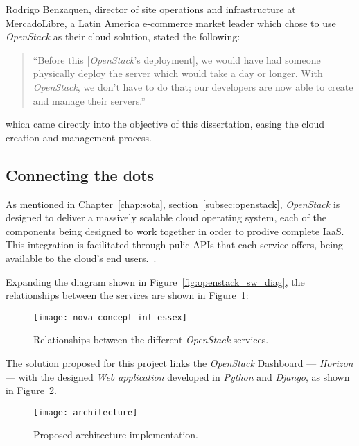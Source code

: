 Rodrigo Benzaquen, director of site operations and infrastructure at MercadoLibre, a Latin America e-commerce market leader which chose to use \textit{OpenStack} as their cloud solution, stated the following:

\begin{quote}
 ``Before this [\textit{OpenStack}'s deployment], we would have had someone physically deploy the server which would take a day or longer. With \textit{OpenStack}, we don't have to do that; our developers are now able to create and manage their servers.''\cite{openstack-userstories}
\end{quote}

which came directly into the objective of this dissertation, easing the cloud creation and management process.

\clearpage
\subsection{Connecting the dots}\label{subsec:architecture}

As mentioned in Chapter~\ref{chap:sota}, section~\ref{subsec:openstack}, \textit{OpenStack} is designed to deliver a massively scalable cloud operating system, each of the components being designed to work together in order to prodive complete IaaS. This integration is facilitated through pulic APIs that each service offers, being available to the cloud's end users.~\cite{ken-pepple:essex-arch}. 

Expanding the diagram shown in Figure~\ref{fig:openstack_sw_diag}, the relationships between the services are shown in Figure~\ref{fig:openstack_services}:

\begin{figure}[h!]
  \begin{center}
    \leavevmode
    \texttt{[image: nova-concept-int-essex]}
    \caption{Relationships between the different \textit{OpenStack} services\cite{ken-pepple:essex-arch}.}
    \label{fig:openstack_services}
  \end{center}
\end{figure}

The solution proposed for this project links the \textit{OpenStack} Dashboard --- \textit{Horizon} --- with the designed \textit{Web application} developed in \textit{Python} and \textit{Django}, as shown in Figure~\ref{fig:architecture}.

\begin{figure}[t]
  \begin{center}
    \leavevmode
    \texttt{[image: architecture]}
    \caption{Proposed architecture implementation.}
    \label{fig:architecture}
  \end{center}
\end{figure}

